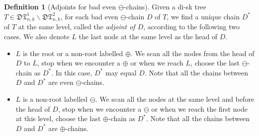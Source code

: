 \documentclass[12pt]{amsart}
\numberwithin{equation}{section}
\theoremstyle{plain}
\theoremstyle{definition}
\newtheorem{Def}[theorem]{Definition}
\def\D{\mathfrak{D}}
\def\T{\mathfrak{T}}
\begin{document}
\begin{Def}[Adjoints for bad even $\ominus$-chains]\label{L}
Given a di-sk tree $T\in \D\T^{1}_{n,k}\backslash \D\T^{2}_{n,k}$, for each bad even $\ominus$-chain $D$ of $T$, we find a unique chain $D^*$ of $T$ at the same level, called the {\em adjoint of $D$}, according to the following two cases. We also denote $L$ the last node at the same level as the head of $D$.
\begin{itemize}
\item[Case $I'$:] $L$ is the root or a non-root labelled $\oplus$. We scan all the nodes from the head of $D$ to $L$, stop when we encounter a $\oplus$ or when we reach $L$, choose the last $\ominus$-chain as $D^*$. In this case, $D^*$ may equal $D$. Note that all the chains between $D$ and $D^*$ are even $\ominus$-chains. 
\item[Case $II'$:] $L$ is a non-root labelled $\ominus$. We scan all the nodes at the same level and before the head of $D$, stop when we encounter a $\ominus$ or when we reach the first node at this level, choose the last $\oplus$-chain as $D^*$. Note that all the chains between $D$ and $D^*$ are $\oplus$-chains.
\end{itemize}
%
%
\end{Def}
 
\end{document}
